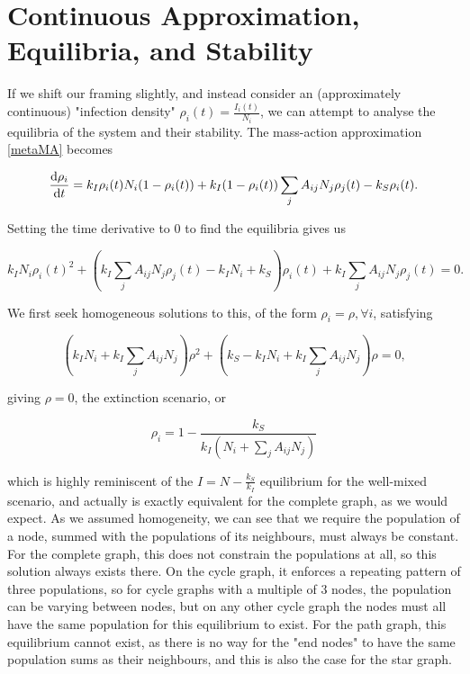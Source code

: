 \documentclass[12pt,a4paper,openany,twoside]{book}
\renewcommand{\d}{{\mathrm d}}
\newcommand{\fd}[2]{\mathchoice{\frac{\d #1}{\d #2}}{\d #1/\d #2}{\d #1/\d #2}{\d #1/\d #2}}
\begin{document}
\section{Continuous Approximation, Equilibria, and Stability}

If we shift our framing slightly, and instead consider an (approximately continuous) "infection density" $\rho_i(t) = \frac {I_i(t)} {N_i}$, we can attempt to analyse the equilibria of the system and their stability. The mass-action approximation \ref{metaMA} becomes

\begin{equation}
	\fd {\rho_i} {t} = k_I \rho_i(t) N_i (1- \rho_i(t)) + k_I (1 - \rho_i(t)) \sum_j A_{ij} N_j \rho_j(t) - k_S \rho_i(t).
\end{equation}

Setting the time derivative to $0$ to find the equilibria gives us

\begin{equation}
	k_I N_i \rho_i(t)^2 + (k_I \sum_j A_{ij} N_j \rho_j(t) - k_I N_i + k_S) \rho_i(t) + k_I \sum_j A_{ij} N_j \rho_j(t) = 0.
\end{equation}

We first seek homogeneous solutions to this, of the form $\rho_i = \rho, \forall i$, satisfying

\begin{equation}
	(k_I N_i + k_I \sum_j A_{ij} N_j) \rho^2 + (k_S - k_I N_i + k_I \sum_j A_{ij} N_j) \rho = 0,
\end{equation}

giving $\rho = 0$, the extinction scenario, or

\begin{equation}
	\rho_i = 1 - \frac {k_S} {k_I (N_i + \sum_j A_{ij} N_j)}
	\label{metaHomEq}
\end{equation}

which is highly reminiscent of the $I = N - \frac {k_S} {k_I}$ equilibrium for the well-mixed scenario, and actually is exactly equivalent for the complete graph, as we would expect. As we assumed homogeneity, we can see that we require the population of a node, summed with the populations of its neighbours, must always be constant. For the complete graph, this does not constrain the populations at all, so this solution always exists there. On the cycle graph, it enforces a repeating pattern of three populations, so for cycle graphs with a multiple of $3$ nodes, the population can be varying between nodes, but on any other cycle graph the nodes must all have the same population for this equilibrium to exist. For the path graph, this equilibrium cannot exist, as there is no way for the "end nodes" to have the same population sums as their neighbours, and this is also the case for the star graph.
\end{document}
